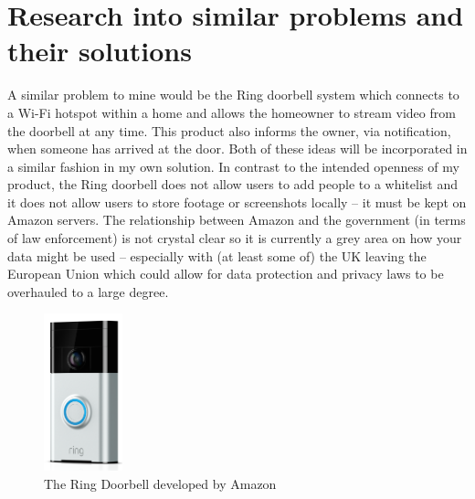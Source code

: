 \documentclass[9pt]{article}
\begin{document}
\section{Research into similar problems and their solutions}\label{sec_research}
A similar problem to mine would be the Ring doorbell system which connects to a Wi-Fi hotspot within a home and allows the homeowner to stream video from the doorbell at any time. This product also informs the owner, via notification, when someone has arrived at the door. Both of these ideas will be incorporated in a similar fashion in my own solution. In contrast to the intended openness of my product, the Ring doorbell does not allow users to add people to a whitelist and it does not allow users to store footage or screenshots locally – it must be kept on Amazon servers. The relationship between Amazon and the government (in terms of law enforcement) is not crystal clear so it is currently a grey area on how your data might be used – especially with (at least some of) the UK leaving the European Union which could allow for data protection and privacy laws to be overhauled to a large degree.
\begin{figure}[H]
	\centering
	\includegraphics[width=0.9in]{figs/ringDoorbell}
	\caption{The Ring Doorbell developed by Amazon}
	\label{fig:ringdoorbell}
\end{figure}
\end{document}
